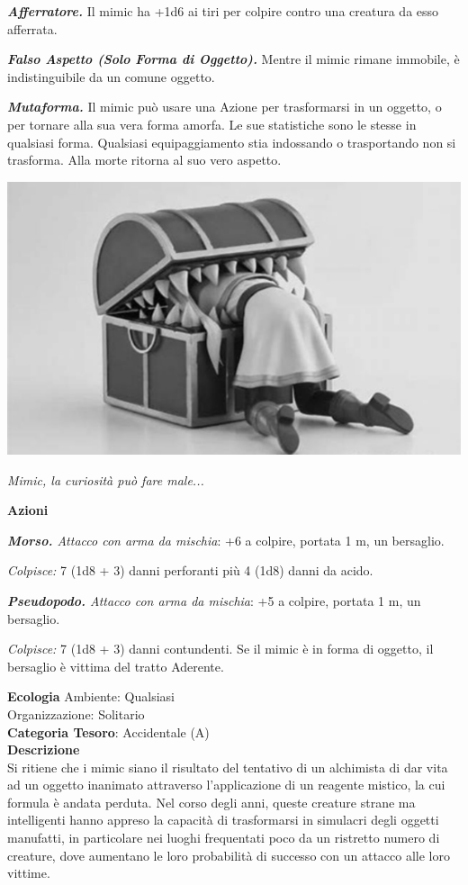 \begin{multicols}{2}
{\emph{\textbf{Afferratore.}} Il mimic ha +1d6 ai tiri per colpire contro una creatura da esso afferrata.

\emph{\textbf{Falso Aspetto (Solo Forma di Oggetto).}} Mentre il mimic rimane immobile, è indistinguibile da un comune oggetto.

\emph{\textbf{Mutaforma.}} Il mimic può usare una Azione per trasformarsi in un oggetto, o per tornare alla sua vera forma amorfa. Le sue statistiche sono le stesse in qualsiasi forma. Qualsiasi equipaggiamento stia indossando o trasportando non si trasforma. Alla morte ritorna al suo vero aspetto.


\medskip

\begin{center}
	\includegraphics[width=0.9\linewidth]{immagini/mimic_grayscale.png}

	\emph{Mimic, la curiosità può fare male...}
\end{center}

\textbf{Azioni}

\emph{\textbf{Morso.} Attacco con arma da mischia}: +6 a colpire, portata 1 m, un bersaglio.

\emph{Colpisce:} 7 (1d8 + 3) danni perforanti più 4 (1d8) danni da acido.

\emph{\textbf{Pseudopodo.} Attacco con arma da mischia}: +5 a colpire, portata 1 m, un bersaglio.

\emph{Colpisce:} 7 (1d8 + 3) danni contundenti. Se il mimic è in forma di oggetto, il bersaglio è vittima del tratto Aderente.

\textbf{Ecologia}
Ambiente: Qualsiasi\\
Organizzazione: Solitario\\
\textbf{Categoria Tesoro}: Accidentale (A)\\
\textbf{Descrizione}\\
Si ritiene che i mimic siano il risultato del tentativo di un alchimista di dar vita ad un oggetto inanimato attraverso l'applicazione di un reagente mistico, la cui formula è andata perduta. Nel corso degli anni, queste creature strane ma intelligenti hanno appreso la capacità di trasformarsi in simulacri degli oggetti manufatti, in particolare nei luoghi frequentati poco da un ristretto numero di creature, dove aumentano le loro probabilità di successo con un attacco alle loro vittime.

}
\end{multicols}
